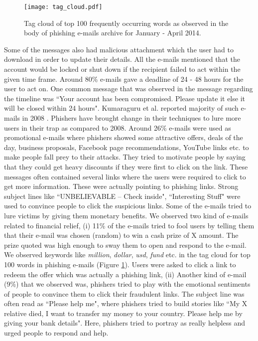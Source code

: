 \documentclass[conference]{IEEEtran}
\begin{document}
\begin{figure}[h]
\centering
\texttt{[image: tag\_cloud.pdf]}
\caption{Tag cloud of top 100 frequently occurring words as observed in the body of phishing e-mails archive for January - April 2014.}
\label{fig:tag_cloud}
\end{figure}
Some of the messages also had malicious attachment which the user had to download in order to update their details. All the e-mails mentioned that the account would be locked or shut down if the recipient failed to act within the given time frame. Around 80\% e-mails gave a deadline of 24 - 48 hours for the user to act on. One common message that was observed in the message regarding the timeline was ``Your account has been compromised. Please update it else it will be closed within 24 hours". Kumaraguru et al. reported majority of such e-mails in 2008 \cite{pk-404}.
\newline
\indent
Phishers have brought change in their techniques to lure more users in their trap as compared to 2008. Around 26\% e-mails were used as promotional e-mails where phishers showed some attractive offers, deals of the day, business proposals, Facebook page recommendations, YouTube links etc. to make people fall prey to their attacks. They tried to motivate people by saying that they could get heavy discounts if they were first to click on the link. These messages often contained several links where the users were required to click to get more information. These were actually pointing to phishing links. Strong subject lines like ``UNBELIEVABLE – Check inside", ``Interesting Stuff" were used to convince people to click the suspicious links.
Some of the e-mails tried to lure victims by giving them monetary benefits. We observed two kind of e-mails related to financial relief, (i) 11\% of the e-mails tried to fool users by telling them that their e-mail was chosen (random) to win a cash prize of X amount. The prize quoted was high enough to sway them to open and respond to the e-mail. We observed keywords like \textit{million}, \textit{dollar}, \textit{usd}, \textit{fund} etc. in the tag cloud for top 100 words in phishing e-mails (Figure \ref{fig:tag_cloud}). Users were asked to click a link to redeem the offer which was actually a phishing link, (ii) Another kind of e-mail (9\%) that we observed was, phishers tried to play with the emotional sentiments of people to convince them to click their fraudulent links. The subject line was often read as ``Please help me", where phishers tried to build stories like ``My X relative died, I want to transfer my money to your country. Please help me by giving your bank details". Here, phishers tried to portray as really helpless and urged people to respond and help.
\end{document}
